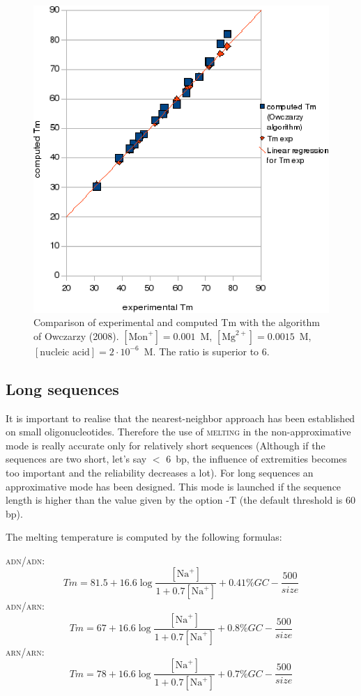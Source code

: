 \documentclass{article}
\begin{document}
\begin{figure}[H]
\includegraphics{Owczarzy1.eps}
\caption{Comparison of experimental and computed Tm with the algorithm of Owczarzy (2008). 
$[\mbox{Mon}^+] = 0.001$~M, $[\mbox{Mg}^{2+}] = 0.0015$~M, $[\mbox{nucleic acid}] =
2\cdot{}10^{-6}$~M. The ratio is superior to 6.}
\end{figure}
    
\subsection{Long sequences }  
  It is important to realise that the nearest-neighbor approach 
has been established  on small oligonucleotides. Therefore the use of \textsc{melting} 
in the non-approximative  mode is really accurate only for relatively short 
sequences (Although if the sequences are two short, let's say $<$ 6~bp, the 
influence of extremities becomes too important and the  reliability decreases 
a lot). For long sequences an approximative mode has been designed. This mode is 
launched if the sequence length is higher than the value 
given by the option -T (the default threshold is 60 bp).
 
The melting temperature is computed by the following formulas:   

\textsc{adn/adn}:
\begin{displaymath}
Tm = 81.5 + 16.6\log\frac{[\mbox{Na}^+]}{1+0.7[\mbox{Na}^+]} + 0.41\% GC - \frac{500}{size}
\end{displaymath}
\textsc{adn/arn}:
\begin{displaymath}
Tm = 67 + 16.6\log\frac{[\mbox{Na}^+]}{1+0.7[\mbox{Na}^+]} + 0.8\% GC - \frac{500}{size}
\end{displaymath}
\textsc{arn/arn}:
\begin{displaymath}
Tm = 78 + 16.6\log\frac{[\mbox{Na}^+]}{1+0.7[\mbox{Na}^+]} + 0.7\% GC - \frac{500}{size}
\end{displaymath}
\end{document}
